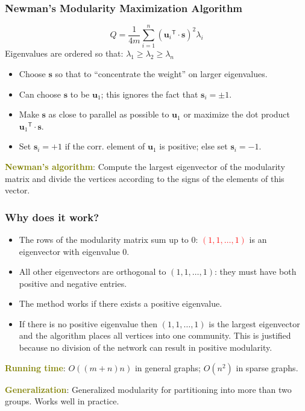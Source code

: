 \documentclass[xcolor=table]{beamer}
\newcommand{\highlight}[1]{\textcolor{olive}{\textbf{#1}}}
\newcommand{\trans}[1]{\ensuremath{{#1}^{\scriptscriptstyle \mathsf{T}}}}
\newcommand{\vect}[1]{\ensuremath{\boldsymbol{#1}}}
\begin{document}
\begin{frame}[t]
\frametitle{Newman's Modularity Maximization Algorithm}
 \[
 	Q = \frac{1}{4m} \sum_{i = 1}^{n}\left ( \trans{\vect{u}_i} \cdot \vect{s} \right )^2 \lambda_i
\]
Eigenvalues are ordered so that: $\lambda_1 \geq \lambda_2 \geq \lambda_n$
\begin{itemize}
	\item Choose $\vect{s}$ so that to ``concentrate the weight'' on larger eigenvalues.
	\item Can choose $\vect{s}$ to be $\vect{u}_1$; this ignores the fact that $\vect{s}_i = \pm 1$.
	\item Make $\vect{s}$ as close to parallel as possible to $\vect{u}_1$ or maximize the 
		dot product $\trans{\vect{u}_1} \cdot \vect{s}$.
	\item Set $\vect{s}_i = +1$ if the corr. element of $\vect{u}_1$ is positive;
		else set $\vect{s}_i = -1$. 
\end{itemize}

\highlight{Newman's algorithm}: Compute the largest eigenvector of the modularity matrix and 
	divide the vertices according to the signs of the elements of this vector. 
\end{frame}

\begin{frame}[t]
\frametitle{Why does it work?}
\begin{itemize}
	\item The rows of the modularity matrix sum up to 0: \textcolor{red}{$(1, 1, \ldots, 1)$} 
		is an eigenvector with eigenvalue $0$.

	\item All other eigenvectors are orthogonal to $(1, 1, \ldots, 1)$: they must have 
		both positive and negative entries. 

	\item The method works if there exists a positive eigenvalue.

	\item If there is no positive eigenvalue then $(1, 1, \ldots, 1)$ is the largest eigenvector 
		and the algorithm places all vertices into one community. This is justified because 
		no division of the network can result in positive modularity. 
\end{itemize}

\highlight{Running time}: $O((m + n)n)$ in general graphs; $O(n^2)$ in sparse graphs.

\medskip

\highlight{Generalization}: Generalized modularity for partitioning into more than two groups. 
Works well in practice. 
\end{frame}
\end{document}
